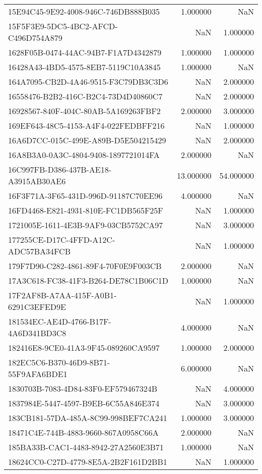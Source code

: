 \begin{tabular}{lrr}
15E94C45-9E92-4008-946C-746DB888B035 & 1.000000 & NaN \\
15F5F3E9-5DC5-4BC2-AFCD-C496D754A879 & NaN & 1.000000 \\
1628F05B-0474-44AC-94B7-F1A7D4342879 & 1.000000 & 1.000000 \\
16428A43-4BD5-4575-8EB7-5119C10A3845 & 1.000000 & NaN \\
164A7095-CB2D-4A46-9515-F3C79DB3C3D6 & NaN & 2.000000 \\
16558476-B2B2-416C-B2C4-73D4D40860C7 & NaN & 2.000000 \\
16928567-840F-404C-80AB-5A169263FBF2 & 2.000000 & 3.000000 \\
169EF643-48C5-4153-A4F4-022FEDBFF216 & NaN & 1.000000 \\
16A6D7CC-015C-499E-A89B-D5E504215429 & NaN & 2.000000 \\
16A8B3A0-0A3C-4804-9408-1897721014FA & 2.000000 & NaN \\
16C997FB-D386-437B-AE18-A3915AB30AE6 & 13.000000 & 54.000000 \\
16F3F71A-3F65-431D-996D-91187C70EE96 & 4.000000 & NaN \\
16FD4468-E821-4931-810E-FC1DB565F25F & NaN & 1.000000 \\
1721005E-1611-4E3B-9AF9-03CB5752CA97 & NaN & 3.000000 \\
177255CE-D17C-4FFD-A12C-ADC57BA34FCB & NaN & 1.000000 \\
179F7D90-C282-4861-89F4-70F0E9F003CB & 2.000000 & NaN \\
17A3C618-FC38-41F3-B264-DE78C1B06C1D & 1.000000 & NaN \\
17F2AF8B-A7AA-415F-A0B1-6291C3EFED9E & NaN & 1.000000 \\
181534EC-AE4D-4766-B17F-4A6D341BD3C8 & 4.000000 & NaN \\
182416E8-9CE0-41A3-9F45-089260CA9597 & 1.000000 & 2.000000 \\
182EC5C6-B370-46D9-8B71-55F9AFA6BDE1 & 6.000000 & NaN \\
1830703B-7083-4D84-83F0-EF579467324B & NaN & 4.000000 \\
1837984E-5447-4597-B9EB-6C55A846E374 & NaN & 3.000000 \\
183CB181-57DA-485A-8C99-998BEF7CA241 & 1.000000 & 3.000000 \\
18471C4E-744B-4883-9660-867A0958C66A & 2.000000 & NaN \\
185BA33B-CAC1-4483-8942-27A2560E3B71 & 1.000000 & NaN \\
18624CC0-C27D-4779-8E5A-2B2F161D2BB1 & NaN & 1.000000 \\

\end{tabular}
